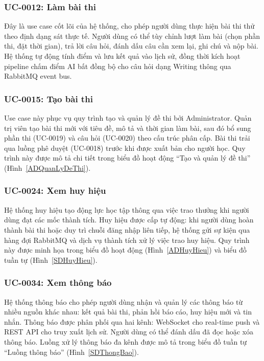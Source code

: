 \subsubsection{UC-0012: Làm bài thi}
Đây là use case cốt lõi của hệ thống, cho phép người dùng thực hiện bài thi thử theo định dạng sát thực tế. Người dùng có thể tùy chỉnh lượt làm bài (chọn phần thi, đặt thời gian), trả lời câu hỏi, đánh dấu câu cần xem lại, ghi chú và nộp bài. Hệ thống tự động tính điểm và lưu kết quả vào lịch sử, đồng thời kích hoạt pipeline chấm điểm AI bất đồng bộ cho câu hỏi dạng Writing thông qua RabbitMQ event bus.



\subsubsection{UC-0015: Tạo bài thi}
Use case này phục vụ quy trình tạo và quản lý đề thi bởi Administrator. Quản trị viên tạo bài thi mới với tiêu đề, mô tả và thời gian làm bài, sau đó bổ sung phần thi (UC-0019) và câu hỏi (UC-0020) theo cấu trúc phân cấp. Bài thi trải qua luồng phê duyệt (UC-0018) trước khi được xuất bản cho người học. Quy trình này được mô tả chi tiết trong biểu đồ hoạt động ``Tạo và quản lý đề thi'' (Hình~\ref{ADQuanLyDeThi}).



\subsubsection{UC-0024: Xem huy hiệu}
Hệ thống huy hiệu tạo động lực học tập thông qua việc trao thưởng khi người dùng đạt các mốc thành tích. Huy hiệu được cấp tự động: khi người dùng hoàn thành bài thi hoặc duy trì chuỗi đăng nhập liên tiếp, hệ thống gửi sự kiện qua hàng đợi RabbitMQ và dịch vụ thành tích xử lý việc trao huy hiệu. Quy trình này được minh họa trong biểu đồ hoạt động (Hình~\ref{ADHuyHieu}) và biểu đồ tuần tự (Hình~\ref{SDHuyHieu}).



\subsubsection{UC-0034: Xem thông báo}
Hệ thống thông báo cho phép người dùng nhận và quản lý các thông báo từ nhiều nguồn khác nhau: kết quả bài thi, phản hồi báo cáo, huy hiệu mới và tin nhắn. Thông báo được phân phối qua hai kênh: WebSocket cho real-time push và REST API cho truy xuất lịch sử. Người dùng có thể đánh dấu đã đọc hoặc xóa thông báo. Luồng xử lý thông báo đa kênh được mô tả trong biểu đồ tuần tự ``Luồng thông báo'' (Hình~\ref{SDThongBao}).


